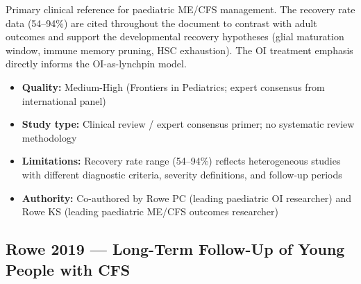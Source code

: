 \begin{description}
\begin{itemize}
    \end{itemize}
    \item[Relevance to ME/CFS:] Primary clinical reference for paediatric ME/CFS management. The recovery rate data (54--94\%) are cited throughout the document to contrast with adult outcomes and support the developmental recovery hypotheses (glial maturation window, immune memory pruning, HSC exhaustion). The OI treatment emphasis directly informs the OI-as-lynchpin model.
    \item[Certainty Assessment:]
    \begin{itemize}
        \item \textbf{Quality:} Medium-High (Frontiers in Pediatrics; expert consensus from international panel)
        \item \textbf{Study type:} Clinical review / expert consensus primer; no systematic review methodology
        \item \textbf{Limitations:} Recovery rate range (54--94\%) reflects heterogeneous studies with different diagnostic criteria, severity definitions, and follow-up periods
        \item \textbf{Authority:} Co-authored by Rowe PC (leading paediatric OI researcher) and Rowe KS (leading paediatric ME/CFS outcomes researcher)
    \end{itemize}
\end{description}

\subsection{Rowe 2019 --- Long-Term Follow-Up of Young People with CFS}

